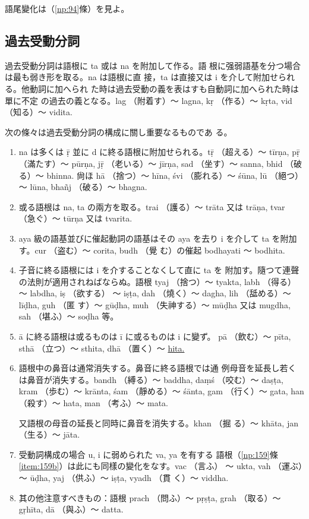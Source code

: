 語尾變化は（\ref{np:94}條）を見よ。

\subsection{過去受動分詞}
\numberParagraph
過去受動分詞は語根に ta 或は na を附加して作る。語
根に强弱語基を分つ場合は最も弱き形を取る。na は語根に直
接，ta は直接又は i を介して附加せられる。他動詞に加へられ
た時は過去受動の義を表はすも自動詞に加へられた時は單に不定
の過去の義となる。lag （附着す）～ lagna, kṛ （作る）～ kṛta, vid
（知る）～ vidita.

\numberParagraph \label{np:179}
次の條々は過去受動分詞の構成に關し重要なるものであ
る。
\begin{enumerate}[label=(\alph*)]
\item na は多くは ṝ 並に d に終る語根に附加せられる。tṝ
（超える）～ tīrṇa, pṝ （滿たす）～ pūrṇa, jṝ （老いる）～
jīrṇa, sad （坐す）～ sanna, bhid （破る）～ bhinna. 尙ほ
hā （捨つ）～ hīna, śvi （膨れる）～ śūna, lū （絕つ）～ lūna,
bhañj （破る）～ bhagna.
\item 或る語根は na, ta の兩方を取る。trai （護る）～ trāta
又は trāṇa, tvar （急ぐ）～ tūrṇa 又は tvarita.
\item aya 級の語基並びに催起動詞の語基はその aya を去り
i を介して ta を附加す。cur （盗む）～ corita, budh （覺
む）の催起 bodhayati ～ bodhita.
\item 子音に終る語根には i を介することなくして直に ta を
附加す。隨つて連聲の法則が適用されねばならぬ。語根
tyaj （捨つ）～ tyakta, labh （得る）～ labdha, iṣ （欲する）
～ iṣṭa, dah （燒く）～ dagha, lih （䑛める）～ līḍha, guh （匿
す）～ gūḍha, muh （失神する）～ mūḍha 又は mugdha, sah
（堪ふ）～ soḍha 等。
\item ā に終る語根は或るものは ī に或るものは i に變ず。
pā （飲む）～ pīta, sthā （立つ）～ sthita, dhā （置く）～ \underline{hita.}
\item 語根中の鼻音は通常消失する。鼻音に終る語根では通
例母音を延長し若くは鼻音が消失する。bandh （縛る）～
baddha, daṃś （咬む）～ daṣṭa, kram （歩む）～ krānta, śam
（靜める）～ śānta, gam （行く）～ gata, han （殺す）～ hata,
man （考ふ）～ mata.

又語根の母音の延長と同時に鼻音を消失する。khan （掘
る）～ khāta, jan （生る）～ jāta.
\item 受動詞構成の場合 u, i に弱められた va, ya を有する
語根（\ref{np:159}條 \ref{item:159b}）は此にも同樣の變化をなす。vac （言ふ）
～ ukta, vah （運ぶ）～ ūḍha, yaj （供ふ）～ iṣṭa, vyadh （貫
く）～ viddha.
\item 其の他注意すべきもの：語根 prach （問ふ）～ pṛṣṭa,
grah （取る）～ gṛhīta, dā （與ふ）～ datta.
\end{enumerate}

